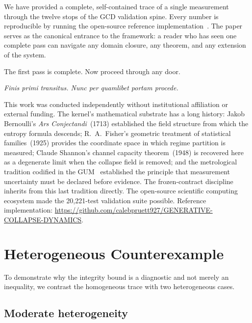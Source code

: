 \documentclass[
  aps,
  prd,
  twocolumn,
  superscriptaddress,
  nofootinbib,
  floatfix
]{revtex4-2}
\begin{document}
We have provided a complete, self-contained trace of a single
measurement through the twelve stops of the GCD validation spine.
Every number is reproducible by running the open-source reference
implementation~\cite{umcpmetadatarepo}.  The paper serves as the
canonical entrance to the framework: a reader who has seen one
complete pass can navigate any domain closure, any theorem, and any
extension of the system.

The first pass is complete.  Now proceed through any door.

\emph{Finis primi transitus.  Nunc per quamlibet portam procede.}

\begin{acknowledgments}
This work was conducted independently without institutional
affiliation or external funding.  The kernel's mathematical
substrate has a long history: Jakob Bernoulli's \emph{Ars
Conjectandi}~(1713) established the field structure from which the
entropy formula descends; R.~A.~Fisher's geometric treatment of
statistical families~(1925) provides the coordinate space in which
regime partition is measured; Claude Shannon's channel capacity
theorem~(1948) is recovered here as a degenerate limit when the
collapse field is removed; and the metrological tradition
codified in the GUM~\cite{jcgm2008gum} established the principle
that measurement uncertainty must be declared before evidence.
The frozen-contract discipline inherits from this last tradition
directly.  The open-source scientific computing ecosystem made
the 20{,}221-test validation suite possible.  Reference
implementation:
\url{https://github.com/calebpruett927/GENERATIVE-COLLAPSE-DYNAMICS}.
\end{acknowledgments}

\appendix

\section{Heterogeneous Counterexample}\label{app:heterogeneous}

To demonstrate why the integrity bound is a diagnostic and not merely
an inequality, we contrast the homogeneous trace with two
heterogeneous cases.

\subsection{Moderate heterogeneity}
\end{document}
